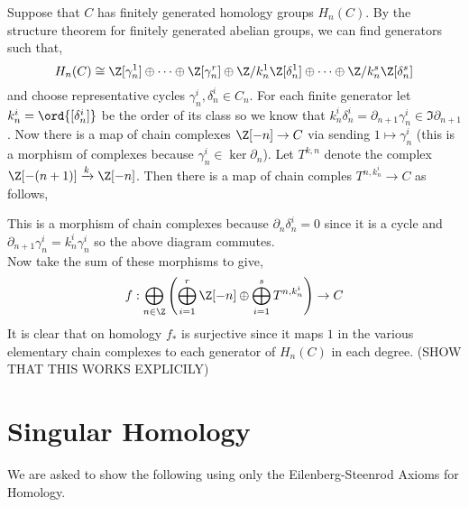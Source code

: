 \documentclass[12pt]{extarticle}
\begin{document}
\begin{exercise}
Suppose that $C$ has finitely generated homology groups $H_n(C)$. By the structure theorem for finitely generated abelian groups, we can find generators such that,
\[ H_n(C) \cong \Z [\gamma_n^1] \oplus \cdots \oplus \Z [ \gamma_n^r] \oplus \Z / k_n^1 \Z [\delta_n^1] \oplus \cdots \oplus \Z / k_n^s \Z [\delta_n^s] \]
and choose representative cycles $\gamma^i_n, \delta^i_n \in C_n$. For each finite generator let $k^i_n = \ord{[\delta^i_n]}$ be the order of its class so we know that $k^i_n \delta^i_n = \partial_{n+1} \gamma^i_{n} \in \Im{\partial_{n+1}}$. Now there is a map of chain complexes $\Z[-n] \to C$ via sending $1 \mapsto \gamma_n^i$ (this is a morphism of complexes because $\gamma_n^i \in \ker{\partial_n}$). Let $T^{k,n}$ denote the complex $\Z[-(n+1)] \xrightarrow{k} \Z[-n]$. Then there is a map of chain comples $T^{n,k^i_n} \to C$ as follows,
\begin{center}
\end{center} 
This is a morphism of chain complexes because $\partial_n \delta_n^i = 0$ since it is a cycle and $\partial_{n+1} \gamma^i_n = k^i_n \gamma^i_n$ so the above diagram commutes. 
\bigskip\\
Now take the sum of these morphisms to give,
\[ f : \bigoplus_{n \in \Z} \left( \bigoplus_{i = 1}^r \Z[-n] \oplus \bigoplus_{i = 1}^s T^{n, k^i_n} \right) \to C \] 
It is clear that on homology $f_*$ is surjective since it maps $1$ in the various elementary chain complexes to each generator of $H_n(C)$ in each degree. (SHOW THAT THIS WORKS EXPLICILY)
\end{exercise}

\section{Singular Homology}

We are asked to show the following using only the  Eilenberg-Steenrod Axioms for Homology.
\end{document}

